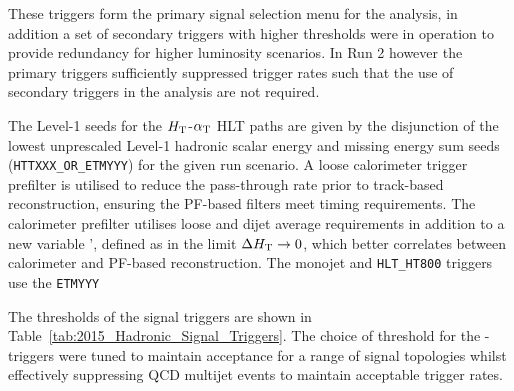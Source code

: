 These triggers form the primary signal selection menu for the analysis, in addition a set of secondary triggers with 
higher thresholds were in operation to provide redundancy for higher luminosity scenarios. In Run 2 however the primary 
triggers sufficiently suppressed trigger rates such that the use of secondary triggers in the analysis are not required.


The Level-1 seeds for the $\mbox{$H_\text{T}$}$-$\alpha_{\text{T}}$ HLT paths are given by the disjunction of the lowest 
unprescaled Level-1 hadronic scalar energy and missing energy sum seeds (\verb!HTTXXX_OR_ETMYYY!) for 
the given run scenario. A loose calorimeter trigger prefilter is utilised to reduce the pass-through 
rate prior to track-based reconstruction, ensuring the PF-based filters meet timing requirements. The calorimeter prefilter 
utilises loose \scalht and dijet average \pt requirements in addition to a new variable \alphat', 
defined as \alphat in the limit $\Delta\mbox{$H_\text{T}$} \rightarrow 0$, which better correlates \alphat 
between calorimeter and PF-based reconstruction. The monojet and \verb!HLT_HT800! triggers use the
\verb!ETMYYY!

The thresholds of the signal triggers are shown in Table~\ref{tab:2015_Hadronic_Signal_Triggers}. The choice of threshold for 
the \scalht-\alphat triggers were tuned to maintain acceptance for a range of signal topologies whilst effectively suppressing QCD 
multijet events to maintain acceptable trigger rates. 




